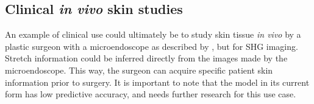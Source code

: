 \subsection{Clinical \emph{in vivo} skin studies}
An example of clinical use could ultimately be to study skin tissue \emph{in vivo} by a plastic surgeon with a microendoscope as described by \citeauthor{Kuzmin2016} , but for SHG imaging.
Stretch information could be inferred directly from the images made by the microendoscope.
This way, the surgeon can acquire specific patient skin information prior to surgery.
It is important to note that the model in its current form has low predictive accuracy, and needs further research for this use case.